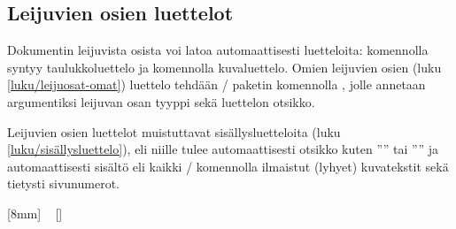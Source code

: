 \subsection{Leijuvien osien luettelot}
\label{luku/leijuosat-luettelot}

Dokumentin leijuvista osista voi latoa automaattisesti luetteloita:
komennolla  syntyy taulukkoluettelo ja komennolla
 kuvaluettelo. Omien leijuvien osien (luku
\ref{luku/leijuosat-omat}) luettelo tehdään \-/
paketin komennolla , jolle annetaan argumentiksi
leijuvan osan tyyppi sekä luettelon otsikko.

\begin{koodilohkosis}
\listoftables                  %
\listoffigures                 %
\end{koodilohkosis}

\noindent
Leijuvien osien luettelot muistuttavat sisällysluetteloita (luku
\ref{luku/sisällysluettelo}), eli niille tulee automaattisesti otsikko
kuten ''\listtablename'' tai ''\listfigurename'' ja automaattisesti
sisältö eli kaikki \-/ komennolla ilmaistut (lyhyet)
kuvatekstit sekä tietysti sivunumerot.

\begin{esimerkki*}

\begin{koodilohko}
[8mm]                                       %
{\addvspace{3bp}\rmfamily\small}            %
{\contentslabel{8mm}}                       %
{}                                          %
{~\small{}\contentspage}   %
[]                                          %
\end{koodilohko}
  \caption{Leijuvien osien luettelon ulkoasua muokataan
    \-/ komennolla, joka on peräisin
    \-/ paketista}
  \label{esim/leijuosat-titlecontents}
\end{esimerkki*}


